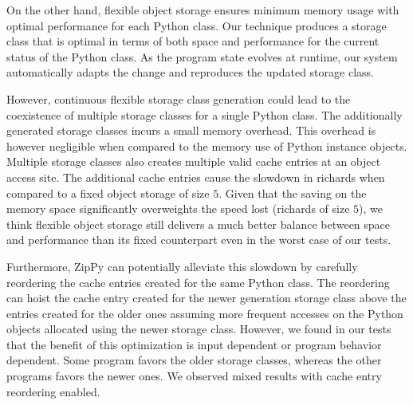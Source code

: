 On the other hand, flexible object storage ensures minimum memory usage with optimal performance for each Python class.
Our technique produces a storage class that is optimal in terms of both space and performance for the current status of the Python class.
As the program state evolves at runtime, our system automatically adapts the change and reproduces the updated storage class.

However, continuous flexible storage class generation could lead to the coexistence of multiple storage classes for a single Python class.
The additionally generated storage classes incurs a small memory overhead.
This overhead is however negligible when compared to the memory use of Python instance objects.
Multiple storage classes also creates multiple valid cache entries at an object access site.
The additional cache entries cause the slowdown in \textsf{richards} when compared to a fixed object storage of size $5$.
Given that the saving on the memory space significantly overweights the speed lost (\textsf{richards} of size $5$), we think flexible object storage still delivers a much better balance between space and performance than its fixed counterpart even in the worst case of our tests.

Furthermore, ZipPy can potentially alleviate this slowdown by carefully reordering the cache entries created for the same Python class.
The reordering can hoist the cache entry created for the newer generation storage class above the entries created for the older ones assuming more frequent accesses on the Python objects allocated using the newer storage class.
However, we found in our tests that the benefit of this optimization is input dependent or program behavior dependent.
Some program favors the older storage classes, whereas the other programs favors the newer ones.
We observed mixed results with cache entry reordering enabled.
